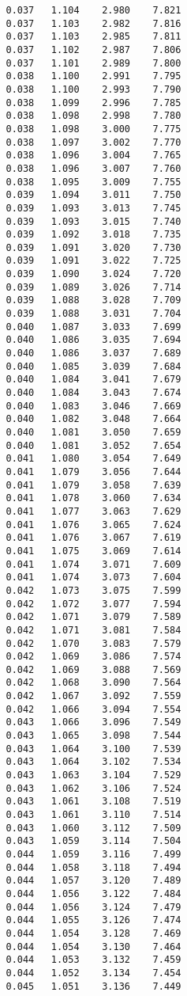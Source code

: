 \begin{verbatim}
   0.037   1.104    2.980    7.821
   0.037   1.103    2.982    7.816
   0.037   1.103    2.985    7.811
   0.037   1.102    2.987    7.806
   0.037   1.101    2.989    7.800
   0.038   1.100    2.991    7.795
   0.038   1.100    2.993    7.790
   0.038   1.099    2.996    7.785
   0.038   1.098    2.998    7.780
   0.038   1.098    3.000    7.775
   0.038   1.097    3.002    7.770
   0.038   1.096    3.004    7.765
   0.038   1.096    3.007    7.760
   0.038   1.095    3.009    7.755
   0.039   1.094    3.011    7.750
   0.039   1.093    3.013    7.745
   0.039   1.093    3.015    7.740
   0.039   1.092    3.018    7.735
   0.039   1.091    3.020    7.730
   0.039   1.091    3.022    7.725
   0.039   1.090    3.024    7.720
   0.039   1.089    3.026    7.714
   0.039   1.088    3.028    7.709
   0.039   1.088    3.031    7.704
   0.040   1.087    3.033    7.699
   0.040   1.086    3.035    7.694
   0.040   1.086    3.037    7.689
   0.040   1.085    3.039    7.684
   0.040   1.084    3.041    7.679
   0.040   1.084    3.043    7.674
   0.040   1.083    3.046    7.669
   0.040   1.082    3.048    7.664
   0.040   1.081    3.050    7.659
   0.040   1.081    3.052    7.654
   0.041   1.080    3.054    7.649
   0.041   1.079    3.056    7.644
   0.041   1.079    3.058    7.639
   0.041   1.078    3.060    7.634
   0.041   1.077    3.063    7.629
   0.041   1.076    3.065    7.624
   0.041   1.076    3.067    7.619
   0.041   1.075    3.069    7.614
   0.041   1.074    3.071    7.609
   0.041   1.074    3.073    7.604
   0.042   1.073    3.075    7.599
   0.042   1.072    3.077    7.594
   0.042   1.071    3.079    7.589
   0.042   1.071    3.081    7.584
   0.042   1.070    3.083    7.579
   0.042   1.069    3.086    7.574
   0.042   1.069    3.088    7.569
   0.042   1.068    3.090    7.564
   0.042   1.067    3.092    7.559
   0.042   1.066    3.094    7.554
   0.043   1.066    3.096    7.549
   0.043   1.065    3.098    7.544
   0.043   1.064    3.100    7.539
   0.043   1.064    3.102    7.534
   0.043   1.063    3.104    7.529
   0.043   1.062    3.106    7.524
   0.043   1.061    3.108    7.519
   0.043   1.061    3.110    7.514
   0.043   1.060    3.112    7.509
   0.043   1.059    3.114    7.504
   0.044   1.059    3.116    7.499
   0.044   1.058    3.118    7.494
   0.044   1.057    3.120    7.489
   0.044   1.056    3.122    7.484
   0.044   1.056    3.124    7.479
   0.044   1.055    3.126    7.474
   0.044   1.054    3.128    7.469
   0.044   1.054    3.130    7.464
   0.044   1.053    3.132    7.459
   0.044   1.052    3.134    7.454
   0.045   1.051    3.136    7.449

\end{verbatim}
